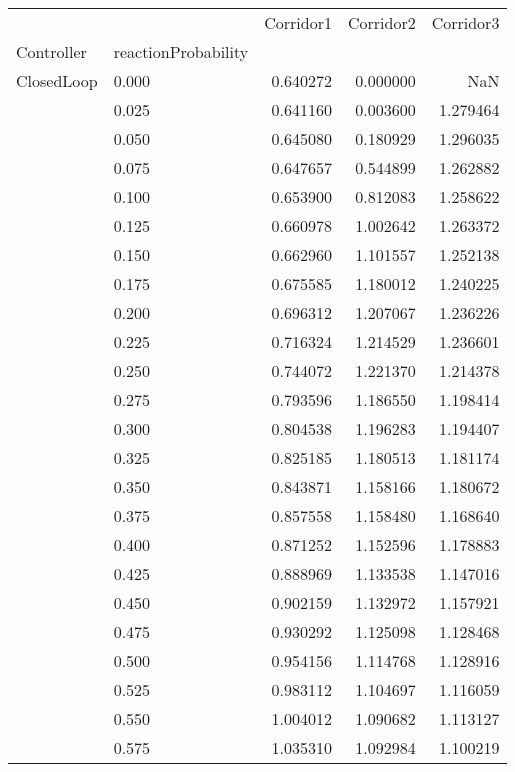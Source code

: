 \begin{tabular}{llrrr}
\toprule
         &       &  Corridor1 &  Corridor2 &  Corridor3 \\
Controller & reactionProbability &            &            &            \\
\midrule
ClosedLoop & 0.000 &   0.640272 &   0.000000 &        NaN \\
         & 0.025 &   0.641160 &   0.003600 &   1.279464 \\
         & 0.050 &   0.645080 &   0.180929 &   1.296035 \\
         & 0.075 &   0.647657 &   0.544899 &   1.262882 \\
         & 0.100 &   0.653900 &   0.812083 &   1.258622 \\
         & 0.125 &   0.660978 &   1.002642 &   1.263372 \\
         & 0.150 &   0.662960 &   1.101557 &   1.252138 \\
         & 0.175 &   0.675585 &   1.180012 &   1.240225 \\
         & 0.200 &   0.696312 &   1.207067 &   1.236226 \\
         & 0.225 &   0.716324 &   1.214529 &   1.236601 \\
         & 0.250 &   0.744072 &   1.221370 &   1.214378 \\
         & 0.275 &   0.793596 &   1.186550 &   1.198414 \\
         & 0.300 &   0.804538 &   1.196283 &   1.194407 \\
         & 0.325 &   0.825185 &   1.180513 &   1.181174 \\
         & 0.350 &   0.843871 &   1.158166 &   1.180672 \\
         & 0.375 &   0.857558 &   1.158480 &   1.168640 \\
         & 0.400 &   0.871252 &   1.152596 &   1.178883 \\
         & 0.425 &   0.888969 &   1.133538 &   1.147016 \\
         & 0.450 &   0.902159 &   1.132972 &   1.157921 \\
         & 0.475 &   0.930292 &   1.125098 &   1.128468 \\
         & 0.500 &   0.954156 &   1.114768 &   1.128916 \\
         & 0.525 &   0.983112 &   1.104697 &   1.116059 \\
         & 0.550 &   1.004012 &   1.090682 &   1.113127 \\
         & 0.575 &   1.035310 &   1.092984 &   1.100219 \\

\end{tabular}
